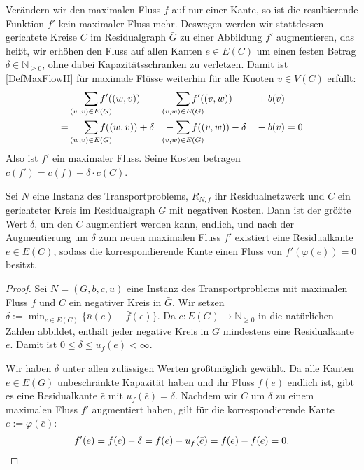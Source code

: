 Verändern wir den maximalen Fluss $f$ auf nur einer Kante, so ist die resultierende Funktion $f'$ kein maximaler Fluss mehr. Deswegen werden wir stattdessen gerichtete Kreise $C$ im Residualgraph $\bar{G}$ zu einer Abbildung $f'$ augmentieren, das heißt, wir erhöhen den Fluss auf allen Kanten $e\in E(C)$ um einen festen Betrag $\delta\in\mathbb{N}_{\geq0}$, ohne dabei Kapazitätsschranken zu verletzen. Damit ist \cref{DefMaxFlowII} für maximale Flüsse weiterhin für alle Knoten $v\in V(C)$ erfüllt:
\begin{alignat*}{3}
&\smashoperator[r]{\sum_{(w,v)\in E(G)}} f'((w,v)) &&-\sum_{\mathclap{(v,w)\in E(G)}} f'((v,w)) &&+ b(v)\\
=&\smashoperator[r]{\sum_{(w,v)\in E(G)}} f((w,v)) + \delta &&-\sum_{\mathclap{(v,w)\in E(G)}} f((v,w)) - \delta &&+ b(v) = 0\end{alignat*}
Also ist $f'$ ein maximaler Fluss. Seine Kosten betragen $c(f')=c(f) + \delta\cdot c(C)$.

\begin{lem}\label{negKreis}Sei $N$ eine Instanz des Transportproblems, $R_{N,f}$ ihr Residualnetzwerk und $C$ ein gerichteter Kreis im Residualgraph $\bar{G}$ mit negativen Kosten. Dann ist der größte Wert $\delta$, um den $C$ augmentiert werden kann, endlich, und nach der Augmentierung um $\delta$ zum neuen maximalen Fluss $f'$ existiert eine Residualkante $\bar{e}\in E(C)$, sodass die korrespondierende Kante einen Fluss von $f'(\varphi(\bar{e}))=0$ besitzt. 
\end{lem}
\begin{proof}Sei $N=(G,b,c,u)$ eine Instanz des Transportproblems mit maximalen Fluss $f$ und $C$ ein negativer Kreis in $\bar{G}$. Wir setzen $\delta:=\min_{e\in E(C)}\{\bar{u}(e)-\bar{f}(e)\}$. Da $c\colon E(G)\rightarrow\mathbb{N}_{\geq0}$ in die natürlichen Zahlen abbildet, enthält jeder negative Kreis in $\bar{G}$ mindestens eine Residualkante $\bar{e}$. Damit ist $0\leq\delta\leq u_f(\bar{e})<\infty$.

Wir haben $\delta$ unter allen zulässigen Werten größtmöglich gewählt. Da alle Kanten $e\in E(G)$ unbeschränkte Kapazität haben und ihr Fluss $f(e)$ endlich ist, gibt es eine Residualkante $\bar{e}$ mit $u_f(\bar{e})=\delta$. Nachdem wir $C$ um $\delta$ zu einem maximalen Fluss $f'$ augmentiert haben, gilt für die korrespondierende Kante $e:=\varphi(\bar{e})$:
\begin{equation*}
f'(e)=f(e)-\delta=f(e)-u_f(\bar{e})=f(e)-f(e)=0.\qedhere
\end{equation*}\end{proof}

